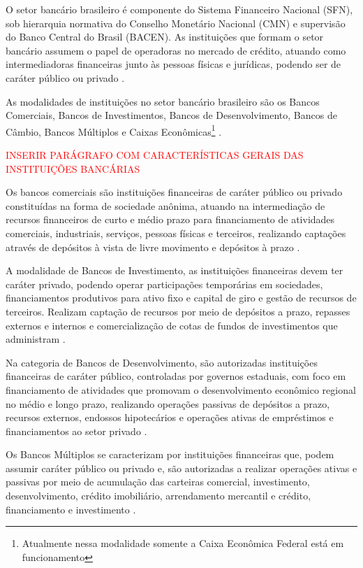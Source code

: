 \documentclass[12pt,openright,oneside,a4paper,chapter=TITLE,section=TITLE,subsection=TITLE,english,french,spanish,portugues,sumario=tradicional]{abntex2}
\begin{document}
O setor bancário brasileiro é componente do Sistema Financeiro Nacional (SFN),
sob hierarquia normativa do Conselho Monetário Nacional (CMN) e supervisão do
Banco Central do Brasil (BACEN). As instituições que formam o setor bancário
assumem o papel de operadoras no mercado de crédito, atuando como
intermediadoras financeiras junto às pessoas físicas e jurídicas, podendo ser
de caráter público ou privado \cite{Lei:4595:1964}.

As modalidades de instituições no setor bancário brasileiro são os Bancos
Comerciais, Bancos de Investimentos, Bancos de Desenvolvimento, Bancos de
Câmbio, Bancos Múltiplos e Caixas Econômicas\footnote{Atualmente nessa
modalidade somente a Caixa Econômica Federal está em funcionamento}
\cite{Lei:4595:1964}.

\textcolor{red}{INSERIR PARÁGRAFO COM CARACTERÍSTICAS GERAIS DAS INSTITUIÇÕES BANCÁRIAS}

Os bancos comerciais são instituições financeiras de caráter público ou privado
constituídas na forma de sociedade anônima, atuando na intermediação de
recursos financeiros de curto e médio prazo para financiamento de atividades
comerciais, industriais, serviços, pessoas físicas e terceiros, realizando
captações através de depósitos à vista de livre movimento e depósitos à prazo
\cite{Res:2099:1994}.

A modalidade de Bancos de Investimento, as instituições financeiras devem ter
caráter privado, podendo operar participações temporárias em sociedades,
financiamentos produtivos para ativo fixo e capital de giro e gestão de
recursos de terceiros. Realizam captação de recursos por meio de depósitos a
prazo, repasses externos e internos e comercialização de cotas de fundos de
investimentos que administram \cite{Res:2624:1999}.

Na categoria de Bancos de Desenvolvimento, são autorizadas instituições
financeiras de caráter público, controladas por governos estaduais, com foco em
financiamento de atividades que promovam o desenvolvimento econômico regional
no médio e longo prazo, realizando operações passivas de depósitos a prazo,
recursos externos, endossos hipotecários e operações ativas de empréstimos e
financiamentos ao setor privado \cite{Res:394:1976}.

Os Bancos Múltiplos se caracterizam por instituições financeiras que, podem
assumir caráter público ou privado e, são autorizadas a realizar operações
ativas e passivas por meio de acumulação das carteiras comercial, investimento,
desenvolvimento, crédito imobiliário, arrendamento mercantil e crédito, financiamento e investimento \cite{Res:2099:1994}.
\end{document}
